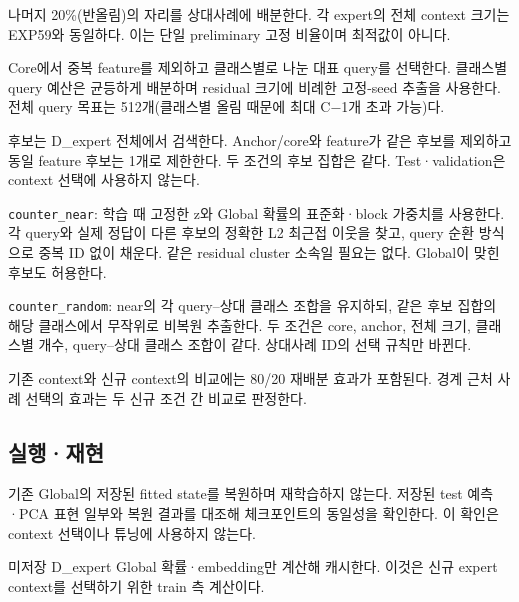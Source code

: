 \par\noindent \textbullet\enspace 나머지 20\%(반올림)의 자리를 상대사례에 배분한다. 각 expert의 전체 context 크기는 EXP59와 동일하다. 이는 단일 preliminary 고정 비율이며 최적값이 아니다.


\par\noindent \textbullet\enspace Core에서 중복 feature를 제외하고 클래스별로 나눈 대표 query를 선택한다. 클래스별 query 예산은 균등하게 배분하며 residual 크기에 비례한 고정-seed 추출을 사용한다. 전체 query 목표는 512개(클래스별 올림 때문에 최대 C−1개 초과 가능)다.


\par\noindent \textbullet\enspace 후보는 D\_\allowbreak{}expert 전체에서 검색한다. Anchor/\allowbreak{}core와 feature가 같은 후보를 제외하고 동일 feature 후보는 1개로 제한한다. 두 조건의 후보 집합은 같다. Test·validation은 context 선택에 사용하지 않는다.


\par\noindent \textbullet\enspace \texttt{counter\_\allowbreak{}\allowbreak{}near}: 학습 때 고정한 z와 Global 확률의 표준화·block 가중치를 사용한다. 각 query와 실제 정답이 다른 후보의 정확한 L2 최근접 이웃을 찾고, query 순환 방식으로 중복 ID 없이 채운다. 같은 residual cluster 소속일 필요는 없다. Global이 맞힌 후보도 허용한다.


\par\noindent \textbullet\enspace \texttt{counter\_\allowbreak{}\allowbreak{}random}: near의 각 query–상대 클래스 조합을 유지하되, 같은 후보 집합의 해당 클래스에서 무작위로 비복원 추출한다. 두 조건은 core, anchor, 전체 크기, 클래스별 개수, query–상대 클래스 조합이 같다. 상대사례 ID의 선택 규칙만 바뀐다.


\par\noindent \textbullet\enspace 기존 context와 신규 context의 비교에는 80/\allowbreak{}20 재배분 효과가 포함된다. 경계 근처 사례 선택의 효과는 두 신규 조건 간 비교로 판정한다.


\subsection{실행·재현}
\par\noindent \textbullet\enspace 기존 Global의 저장된 fitted state를 복원하며 재학습하지 않는다. 저장된 test 예측·PCA 표현 일부와 복원 결과를 대조해 체크포인트의 동일성을 확인한다. 이 확인은 context 선택이나 튜닝에 사용하지 않는다.


\par\noindent \textbullet\enspace 미저장 D\_\allowbreak{}expert Global 확률·embedding만 계산해 캐시한다. 이것은 신규 expert context를 선택하기 위한 train 측 계산이다.


